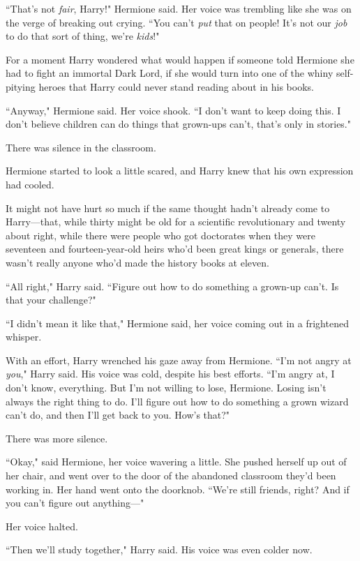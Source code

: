 ``That's not \emph{fair}, Harry!" Hermione said. Her voice was trembling like she was on the verge of breaking out crying. ``You can't \emph{put} that on people! It's not our \emph{job} to do that sort of thing, we're \emph{kids}!"

For a moment Harry wondered what would happen if someone told Hermione she had to fight an immortal Dark Lord, if she would turn into one of the whiny self-pitying heroes that Harry could never stand reading about in his books.

``Anyway," Hermione said. Her voice shook. ``I don't want to keep doing this. I don't believe children can do things that grown-ups can't, that's only in stories."

There was silence in the classroom.

Hermione started to look a little scared, and Harry knew that his own expression had cooled.

It might not have hurt so much if the same thought hadn't already come to Harry—that, while thirty might be old for a scientific revolutionary and twenty about right, while there were people who got doctorates when they were seventeen and fourteen-year-old heirs who'd been great kings or generals, there wasn't really anyone who'd made the history books at eleven.

``All right," Harry said. ``Figure out how to do something a grown-up can't. Is that your challenge?"

``I didn't mean it like that," Hermione said, her voice coming out in a frightened whisper.

With an effort, Harry wrenched his gaze away from Hermione. ``I'm not angry at \emph{you}," Harry said. His voice was cold, despite his best efforts. ``I'm angry at, I don't know, everything. But I'm not willing to lose, Hermione. Losing isn't always the right thing to do. I'll figure out how to do something a grown wizard can't do, and then I'll get back to you. How's that?"

There was more silence.

``Okay," said Hermione, her voice wavering a little. She pushed herself up out of her chair, and went over to the door of the abandoned classroom they'd been working in. Her hand went onto the doorknob. ``We're still friends, right? And if you can't figure out anything—"

Her voice halted.

``Then we'll study together," Harry said. His voice was even colder now.

